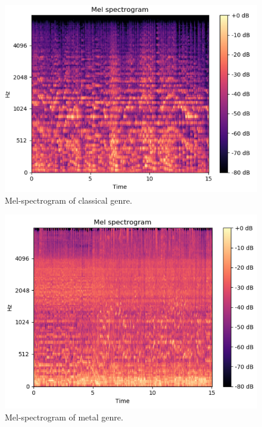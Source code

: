 \begin{figure}
\begin{center}
\includegraphics[scale=0.2]{./figures/classical.png}
\end{center}
\caption
{
Mel-spectrogram of classical genre.
}
\label{fig:big_picture1}
\end{figure}

\begin{figure}
\begin{center}
\includegraphics[scale=0.2]{./figures/metal.png}
\end{center}
\caption
{
Mel-spectrogram of metal genre.
}
\label{fig:big_picture2}
\end{figure}

